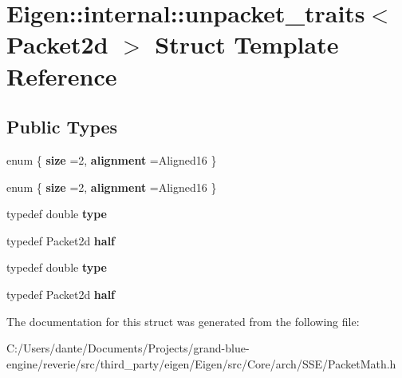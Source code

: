 \hypertarget{struct_eigen_1_1internal_1_1unpacket__traits_3_01_packet2d_01_4}{}\section{Eigen\+::internal\+::unpacket\+\_\+traits$<$ Packet2d $>$ Struct Template Reference}
\label{struct_eigen_1_1internal_1_1unpacket__traits_3_01_packet2d_01_4}
\subsection*{Public Types}
\begin{DoxyCompactItemize}
\item 
\mbox{\label{struct_eigen_1_1internal_1_1unpacket__traits_3_01_packet2d_01_4_a0db7da7b79b1e5647a83c34ac9fe221a}} 
enum \{ {\bfseries size} =2, 
{\bfseries alignment} =Aligned16
 \}
\item 
\mbox{\label{struct_eigen_1_1internal_1_1unpacket__traits_3_01_packet2d_01_4_a002fa3f905ed43bfa543015e60fc099c}} 
enum \{ {\bfseries size} =2, 
{\bfseries alignment} =Aligned16
 \}
\item 
\mbox{\label{struct_eigen_1_1internal_1_1unpacket__traits_3_01_packet2d_01_4_ade249a255fbfe7ea4f99f773430eb5da}} 
typedef double {\bfseries type}
\item 
\mbox{\label{struct_eigen_1_1internal_1_1unpacket__traits_3_01_packet2d_01_4_af1820b9532d7c712b5d1d46fd94d2ea5}} 
typedef Packet2d {\bfseries half}
\item 
\mbox{\label{struct_eigen_1_1internal_1_1unpacket__traits_3_01_packet2d_01_4_ade249a255fbfe7ea4f99f773430eb5da}} 
typedef double {\bfseries type}
\item 
\mbox{\label{struct_eigen_1_1internal_1_1unpacket__traits_3_01_packet2d_01_4_af1820b9532d7c712b5d1d46fd94d2ea5}} 
typedef Packet2d {\bfseries half}
\end{DoxyCompactItemize}


The documentation for this struct was generated from the following file\+:\begin{DoxyCompactItemize}
\item 
C\+:/\+Users/dante/\+Documents/\+Projects/grand-\/blue-\/engine/reverie/src/third\+\_\+party/eigen/\+Eigen/src/\+Core/arch/\+S\+S\+E/Packet\+Math.\+h\end{DoxyCompactItemize}
